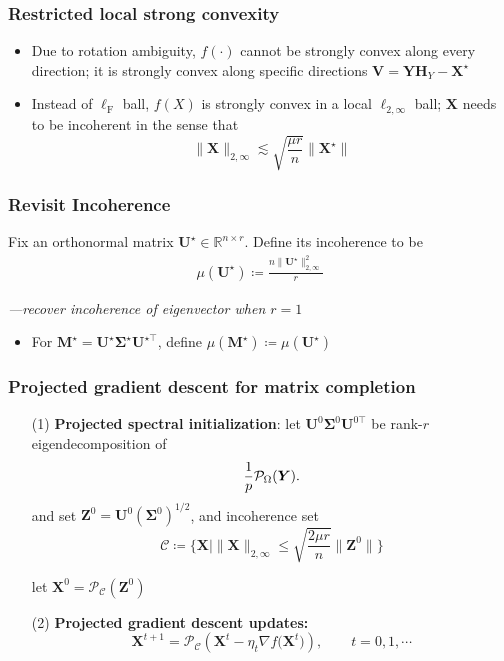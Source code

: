 \documentclass[compress,
mathserif,wide,%
]{beamer}
\begin{document}
\begin{frame}
	\frametitle{Restricted local strong convexity}
	\begin{itemize}
	\itemsep 0.5em
		\item Due to rotation ambiguity, $f(\cdot)$ cannot be strongly convex along every direction; it is strongly convex along specific directions $\bm{V} = \bm{Y}\bm{H}_{Y}-\bm{X}^\star$
		\item Instead of $\ell_{\mathrm{F}}$ ball, $f(X)$ is strongly convex in a local $\ell_{2,\infty}$ ball; $\bm{X}$ needs to be incoherent in the sense that 
		\[
			\|\bm{X}\|_{2, \infty} \lesssim \sqrt{ \frac{\mu r }{n} }\| \bm{X}^\star \|
		\]
	\end{itemize}
\end{frame}



\begin{frame}
	\frametitle{Revisit Incoherence}
	\begin{definition}
	Fix an orthonormal matrix $\bm{U}^\star \in \mathbb{R}^{n \times r}$. Define its incoherence to be
	\begin{align*}
	\mu(\bm{U}^\star) \coloneqq \frac{n\|\bm{U}^{\star}\|_{2,\infty}^{2}}{r} 
\end{align*}
\end{definition}

{\hfill \em ---recover incoherence of eigenvector when $r=1$}

\vfill 
\begin{itemize}
	\item For $\bm{M}^{\star} = \bm{U}^{\star}\bm{\Sigma}^{\star}\bm{U}^{\star\top}$, define $\mu(\bm{M}^\star) \coloneqq \mu(\bm{U}^\star)$
\end{itemize}
\end{frame}




\begin{frame}
 \frametitle{Projected gradient descent for matrix completion}

\begin{itemize}
\itemsep1em
\item[{\color{black}(1)}]  \textbf{{Projected spectral initialization}}: let $\bm{U}^{0}\bm{\Sigma}^{0}\bm{U}^{0\top}$
be rank-$r$ eigendecomposition of 
$$ \frac{1}{p} \mathcal{P}_{\Omega}({\bm Y}).$$ 
and set $\bm{Z}^{0}=\bm{U}^{0}\left(\bm{\Sigma}^{0}\right)^{1/2}$, and incoherence set 
\[
	\mathcal{C} \coloneqq \{ \bm{X} \mid \|\bm{X}\|_{2, \infty} \leq \sqrt{ \frac{2 \mu r }{n} }\| \bm{Z}^0 \| \}
\]

let $\bm{X}^0 = \mathcal{P}_{\mathcal{C}} (\bm{Z}^{0})$

\medskip
	\item[{\color{black}(2)}] {\bf Projected gradient descent updates:} 
$$\bm{X}^{t+1}= \mathcal{P}_{\mathcal{C}} ( \bm{X}^{t}-\eta_{t}\nabla f\big(\bm{X}^{t}\big)),\qquad t=0,1,\cdots $$
\end{itemize}


 

\end{frame}
\end{document}
